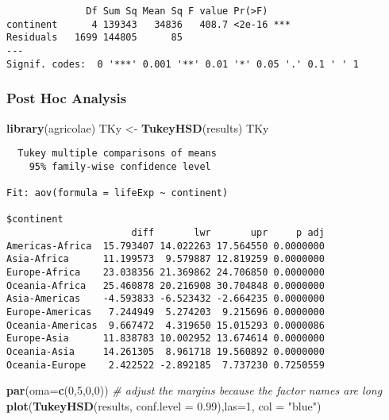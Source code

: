 \documentclass[
]{article}
\newenvironment{Shaded}{\begin{snugshade}}{\end{snugshade}}
\newcommand{\AttributeTok}[1]{\textcolor[rgb]{0.13,0.29,0.53}{#1}}
\newcommand{\CommentTok}[1]{\textcolor[rgb]{0.56,0.35,0.01}{\textit{#1}}}
\newcommand{\DecValTok}[1]{\textcolor[rgb]{0.00,0.00,0.81}{#1}}
\newcommand{\FloatTok}[1]{\textcolor[rgb]{0.00,0.00,0.81}{#1}}
\newcommand{\FunctionTok}[1]{\textcolor[rgb]{0.13,0.29,0.53}{\textbf{#1}}}
\newcommand{\NormalTok}[1]{#1}
\newcommand{\OtherTok}[1]{\textcolor[rgb]{0.56,0.35,0.01}{#1}}
\newcommand{\StringTok}[1]{\textcolor[rgb]{0.31,0.60,0.02}{#1}}
\begin{document}
\begin{verbatim}
              Df Sum Sq Mean Sq F value Pr(>F)    
continent      4 139343   34836   408.7 <2e-16 ***
Residuals   1699 144805      85                   
---
Signif. codes:  0 '***' 0.001 '**' 0.01 '*' 0.05 '.' 0.1 ' ' 1
\end{verbatim}

\hypertarget{post-hoc-analysis}{%
\subsubsection{Post Hoc Analysis}\label{post-hoc-analysis}}

\begin{Shaded}
\begin{Highlighting}[]
\FunctionTok{library}\NormalTok{(agricolae)}
\NormalTok{TKy }\OtherTok{\textless{}{-}} \FunctionTok{TukeyHSD}\NormalTok{(results)}
\NormalTok{TKy}
\end{Highlighting}
\end{Shaded}

\begin{verbatim}
  Tukey multiple comparisons of means
    95% family-wise confidence level

Fit: aov(formula = lifeExp ~ continent)

$continent
                      diff       lwr       upr     p adj
Americas-Africa  15.793407 14.022263 17.564550 0.0000000
Asia-Africa      11.199573  9.579887 12.819259 0.0000000
Europe-Africa    23.038356 21.369862 24.706850 0.0000000
Oceania-Africa   25.460878 20.216908 30.704848 0.0000000
Asia-Americas    -4.593833 -6.523432 -2.664235 0.0000000
Europe-Americas   7.244949  5.274203  9.215696 0.0000000
Oceania-Americas  9.667472  4.319650 15.015293 0.0000086
Europe-Asia      11.838783 10.002952 13.674614 0.0000000
Oceania-Asia     14.261305  8.961718 19.560892 0.0000000
Oceania-Europe    2.422522 -2.892185  7.737230 0.7250559
\end{verbatim}

\begin{Shaded}
\begin{Highlighting}[]
\FunctionTok{par}\NormalTok{(}\AttributeTok{oma=}\FunctionTok{c}\NormalTok{(}\DecValTok{0}\NormalTok{,}\DecValTok{5}\NormalTok{,}\DecValTok{0}\NormalTok{,}\DecValTok{0}\NormalTok{)) }\CommentTok{\# adjust the margins because the factor names are long}
\FunctionTok{plot}\NormalTok{(}\FunctionTok{TukeyHSD}\NormalTok{(results, }\AttributeTok{conf.level =} \FloatTok{0.99}\NormalTok{),}\AttributeTok{las=}\DecValTok{1}\NormalTok{, }\AttributeTok{col =} \StringTok{"blue"}\NormalTok{)}
\end{Highlighting}
\end{Shaded}
\end{document}
